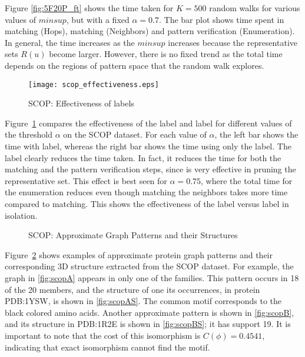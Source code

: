 Figure \ref{fig:5F20P_ft} shows the time taken for $K=500$ random walks
for various values of $minsup$, but with a fixed $\alpha = 0.7$. The bar
plot shows time spent in \khop matching (Hops), \ncl matching
(Neighbors) and pattern verification (Enumeration). In general, the time
increases as the $minsup$ increases because the representative sets
$R(u)$ become larger. However, there is no fixed trend as the total time
depends on the regions of pattern space that the random walk explores.

\begin{figure}[!ht]
  \centerline{
    \texttt{[image: scop\_effectiveness.eps]}
	}
	\caption{SCOP: Effectiveness of labels}
    \label{fig:D5F20P_eff}
\end{figure}

Figure~\ref{fig:D5F20P_eff} compares the effectiveness of the \ncl
label and \khop label for different values of the
threshold $\alpha$ on the SCOP dataset.  For each value of $\alpha$, the
left bar shows the time with \ncl label, whereas the right bar
shows the time using only the \khop label.  The \ncl label clearly
reduces the time taken. In fact, it reduces the time for both the \khop
matching and the pattern verification steps, since \ncl is very
effective in pruning the representative set.  This effect is best seen
for $\alpha = 0.75$, where the total time for the enumeration reduces
even though matching the neighbors takes more time compared to \khop
matching.  This shows the effectiveness of the \ncl label versus
\khop label in isolation.

\begin{figure}[!ht]
  \centerline{
	}
	\centerline{
	}
	\caption{SCOP: Approximate Graph Patterns and their Structures}
	\label{fig:scoppats}
\end{figure}


\smallskip{}
Figure~\ref{fig:scoppats} shows examples of approximate protein graph
patterns and their corresponding 3D structure extracted from the SCOP
dataset.  For example, the graph in \ref{fig:scopA} appears in only one of
the families. This pattern occurs in 18 of the 20 members, and the
structure of one its occurrences, in protein PDB:1YSW, is shown in
\ref{fig:scopAS}. The common motif corresponds to the black colored
amino acids.  Another approximate pattern is shown in \ref{fig:scopB},
and its structure in PDB:1R2E is shown in \ref{fig:scopBS}; it has
support 19.  It is important to note that the cost of this isomorphism
is $C(\phi) = 0.4541$, indicating that exact isomorphism cannot find the
motif.


